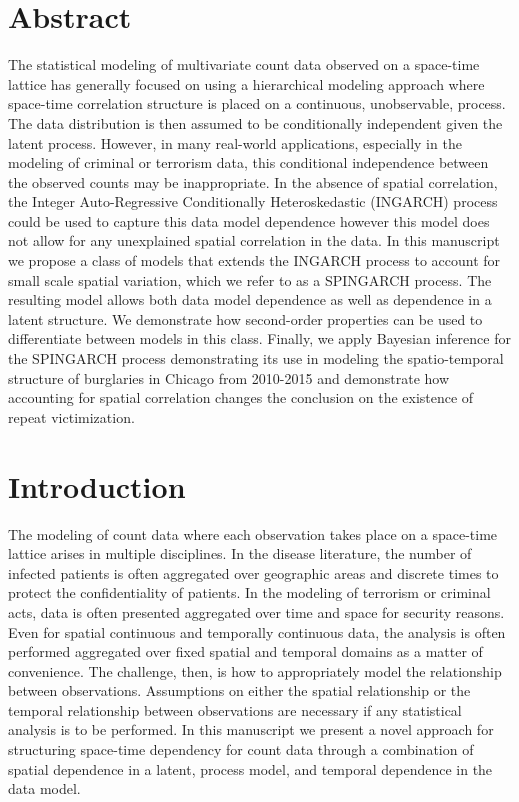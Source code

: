 \documentclass[11pt]{isuthesis}
\begin{document}
\section*{Abstract}
	The statistical modeling of multivariate count data observed on a space-time lattice has generally focused on using a hierarchical modeling approach where space-time correlation structure is placed on a continuous, unobservable, process.  The data distribution is then assumed to be conditionally independent given the latent process.  However, in many real-world applications, especially in the modeling of criminal or terrorism data, this conditional independence between the observed counts may be inappropriate.  In the absence of spatial correlation, the Integer Auto-Regressive Conditionally Heteroskedastic (INGARCH) process could be used to capture this data model dependence however this model does not allow for any unexplained spatial correlation in the data. In this manuscript we propose a class of models that extends the INGARCH process to account for small scale spatial variation, which we refer to as a SPINGARCH process. The resulting model allows both data model dependence as well as dependence in a latent structure.  We demonstrate how second-order properties can be used to differentiate between models in this class.  Finally, we apply Bayesian inference for the SPINGARCH process demonstrating its use in modeling the spatio-temporal structure of burglaries in Chicago from 2010-2015 and demonstrate how accounting for spatial correlation changes the conclusion on the existence of repeat victimization.


\section{Introduction} 

The modeling of count data where each observation takes place on a space-time lattice arises in multiple disciplines.  In the disease literature, the number of infected patients is often aggregated over geographic areas and discrete times to protect the confidentiality of patients.  In the modeling of terrorism or criminal acts, data is often presented aggregated over time and space for security reasons.  Even for spatial continuous and temporally continuous data, the analysis is often performed aggregated over fixed spatial and temporal domains as a matter of convenience.  The challenge, then, is how to appropriately model the relationship between observations.  Assumptions on either the spatial relationship or the temporal relationship between observations are necessary if any statistical analysis is to be performed.  In this manuscript we present a novel approach for structuring space-time dependency for count data through a combination of spatial dependence in a latent, process model, and temporal dependence in the data model.
\end{document}
